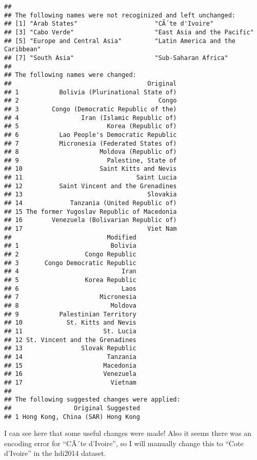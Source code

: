 \documentclass[]{article}
\newenvironment{Shaded}{\begin{snugshade}}{\end{snugshade}}
\newcommand{\CommentTok}[1]{\textcolor[rgb]{0.56,0.35,0.01}{\textit{#1}}}
\newcommand{\KeywordTok}[1]{\textcolor[rgb]{0.13,0.29,0.53}{\textbf{#1}}}
\newcommand{\NormalTok}[1]{#1}
\newcommand{\OperatorTok}[1]{\textcolor[rgb]{0.81,0.36,0.00}{\textbf{#1}}}
\newcommand{\StringTok}[1]{\textcolor[rgb]{0.31,0.60,0.02}{#1}}
\begin{document}
\begin{verbatim}
## 
## The following names were not recoginized and left unchanged:
## [1] "Arab States"                     "CÃ´te d'Ivoire"                 
## [3] "Cabo Verde"                      "East Asia and the Pacific"      
## [5] "Europe and Central Asia"         "Latin America and the Caribbean"
## [7] "South Asia"                      "Sub-Saharan Africa"             
## 
## The following names were changed:
##                                     Original
## 1           Bolivia (Plurinational State of)
## 2                                      Congo
## 3         Congo (Democratic Republic of the)
## 4                 Iran (Islamic Republic of)
## 5                        Korea (Republic of)
## 6           Lao People's Democratic Republic
## 7           Micronesia (Federated States of)
## 8                      Moldova (Republic of)
## 9                        Palestine, State of
## 10                     Saint Kitts and Nevis
## 11                               Saint Lucia
## 12          Saint Vincent and the Grenadines
## 13                                  Slovakia
## 14             Tanzania (United Republic of)
## 15 The former Yugoslav Republic of Macedonia
## 16        Venezuela (Bolivarian Republic of)
## 17                                  Viet Nam
##                          Modified
## 1                         Bolivia
## 2                  Congo Republic
## 3       Congo Democratic Republic
## 4                            Iran
## 5                  Korea Republic
## 6                            Laos
## 7                      Micronesia
## 8                         Moldova
## 9           Palestinian Territory
## 10            St. Kitts and Nevis
## 11                      St. Lucia
## 12 St. Vincent and the Grenadines
## 13                Slovak Republic
## 14                       Tanzania
## 15                      Macedonia
## 16                      Venezuela
## 17                        Vietnam
## 
## The following suggested changes were applied:
##                 Original Suggested
## 1 Hong Kong, China (SAR) Hong Kong
\end{verbatim}

I can see here that some useful changes were made! Also it seems there
was an encoding error for ``CÃ´te d'Ivoire'', so I will manually change
this to ``Cote d'Ivoire'' in the hdi2014 dataset.

\begin{Shaded}
\end{Shaded}
\end{document}
